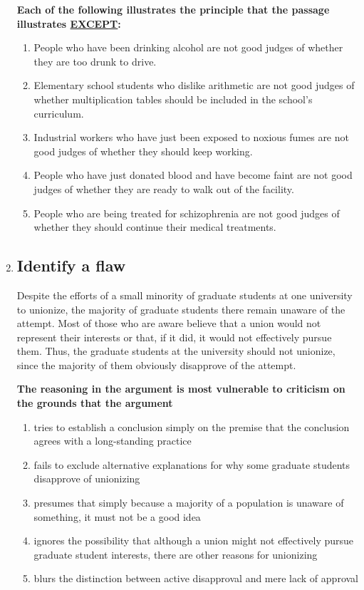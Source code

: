 \documentclass[9pt]{article}
\begin{document}
\begin{multicols}{2}
\begin{enumerate}
 

\noindent
\textbf{Each of the following illustrates the principle that the passage illustrates \underline{EXCEPT}:}

\begin{enumerate}[label=(\alph*)]
    \item People who have been drinking alcohol are not good judges of whether they are too drunk to drive.
    \item Elementary school students who dislike arithmetic are not good judges of whether multiplication tables should be included in the school's curriculum.
    \item Industrial workers who have just been exposed to noxious fumes are not good judges of whether they should keep working.
    \item People who have just donated blood and have become faint are not good judges of whether they are ready to walk out of the facility.
    \item People who are being treated for schizophrenia are not good judges of whether they should continue their medical treatments.
\end{enumerate}


\item
\subsection*{Identify a flaw}
\noindent
Despite the efforts of a small minority of graduate students at one university to unionize, the majority of graduate students there remain unaware of the attempt. Most of those who are aware believe that a union would not represent their interests or that, if it did, it would not effectively pursue them. Thus, the graduate students at the university should not unionize, since the majority of them obviously disapprove of the attempt.

 

\noindent
\textbf{The reasoning in the argument is most vulnerable to criticism on the grounds that the argument}

\begin{enumerate}[label=(\alph*)]
    \item tries to establish a conclusion simply on the premise that the conclusion agrees with a long-standing practice
    \item fails to exclude alternative explanations for why some graduate students disapprove of unionizing
    \item presumes that simply because a majority of a population is unaware of something, it must not be a good idea
    \item ignores the possibility that although a union might not effectively pursue graduate student interests, there are other reasons for unionizing
    \item blurs the distinction between active disapproval and mere lack of approval
\end{enumerate}


\end{enumerate}
\end{multicols}
\end{document}
